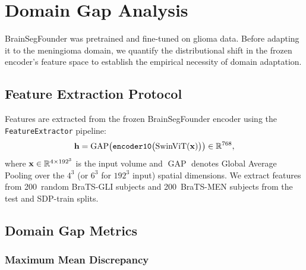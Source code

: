 \section{Domain Gap Analysis}
\label{sec:domain_gap}

BrainSegFounder was pretrained and fine-tuned on glioma data. Before adapting
it to the meningioma domain, we quantify the distributional shift in the
frozen encoder's feature space to establish the empirical necessity of domain
adaptation.

\subsection{Feature Extraction Protocol}
\label{sec:dgap:extraction}

Features are extracted from the frozen BrainSegFounder encoder using the
\texttt{FeatureExtractor} pipeline:
\begin{equation}
  \mathbf{h} = \operatorname{GAP}\bigl(\texttt{encoder10}\bigl(
    \text{SwinViT}(\mathbf{x})\bigr)\bigr) \in \mathbb{R}^{768},
  \label{eq:feature_extraction}
\end{equation}
where $\mathbf{x} \in \mathbb{R}^{4 \times 192^3}$ is the input volume and
$\operatorname{GAP}$ denotes Global Average Pooling over the $4^3$ (or $6^3$
for $192^3$ input) spatial dimensions. We extract features from 200~random
BraTS-GLI subjects and 200~BraTS-MEN subjects from the test and SDP-train
splits.

\subsection{Domain Gap Metrics}
\label{sec:dgap:metrics}

\subsubsection{Maximum Mean Discrepancy}


